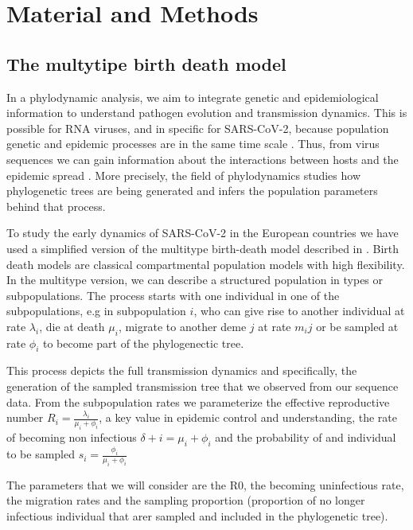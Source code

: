 \chapter{Material and Methods}

\section{The multytipe birth death model}

In a phylodynamic analysis, we aim to integrate genetic and epidemiological information to understand pathogen evolution and transmission dynamics. This is possible for RNA viruses, and in specific for SARS-CoV-2, because population genetic and epidemic processes are in the same time scale \cite{Grenfell2013}. Thus, from virus sequences we can gain information about the interactions between hosts and the epidemic spread \cite{Volz2014}. More precisely, the field of phylodynamics studies how phylogenetic trees are being generated and infers the population parameters behind that process. 

To study the early dynamics of SARS-CoV-2 in the European countries we have used a simplified version of the multitype birth-death model described in \cite{Kuhnert2016}. Birth death models are classical compartmental population models with high flexibility. In the multitype version, we can describe a structured population in types or subpopulations. The process starts with one individual in one of the subpopulations, e.g in subpopulation $i$, who can give rise to another individual at rate $\lambda_i$, die at death $\mu_i$, migrate to another deme $j$ at rate $m_ij$ or be sampled at rate $\phi_i$ to become part of the phylogenectic tree.

This process depicts the full transmission dynamics and specifically, the generation of the sampled transmission tree that we observed from our sequence data. From the subpopulation rates we parameterize the effective reproductive number $R_i = \frac{\lambda_i}{\mu_i + \phi_i}$, a key value in epidemic control and understanding, the rate of becoming non infectious $\delta+i = \mu_i + \phi_i$ and the probability of and individual to be sampled $s_i = \frac{\phi_i}{\mu_i + \phi_i}$

The parameters that we will consider are the R0, the becoming uninfectious rate, the migration rates and the sampling proportion (proportion of no longer infectious individual that arer sampled and included in the phylogenetic tree).

